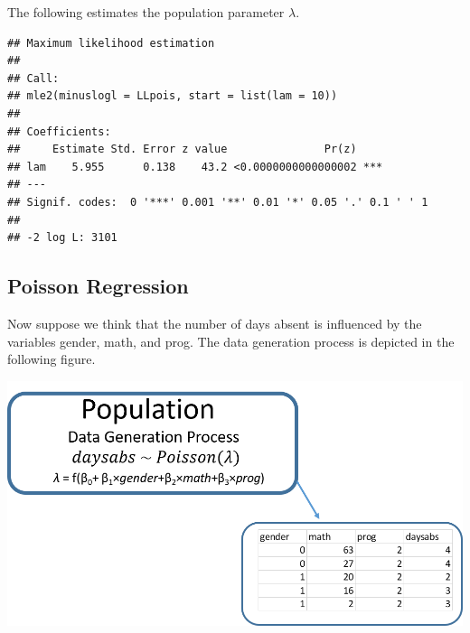 \documentclass[
]{article}
\newenvironment{Shaded}{\begin{snugshade}}{\end{snugshade}}
\newcommand{\AttributeTok}[1]{\textcolor[rgb]{0.77,0.63,0.00}{#1}}
\newcommand{\ControlFlowTok}[1]{\textcolor[rgb]{0.13,0.29,0.53}{\textbf{#1}}}
\newcommand{\DecValTok}[1]{\textcolor[rgb]{0.00,0.00,0.81}{#1}}
\newcommand{\FunctionTok}[1]{\textcolor[rgb]{0.00,0.00,0.00}{#1}}
\newcommand{\NormalTok}[1]{#1}
\newcommand{\OtherTok}[1]{\textcolor[rgb]{0.56,0.35,0.01}{#1}}
\newcommand{\SpecialCharTok}[1]{\textcolor[rgb]{0.00,0.00,0.00}{#1}}
\begin{document}
The following estimates the population parameter \(\lambda\).

\begin{Shaded}
\end{Shaded}

\begin{verbatim}
## Maximum likelihood estimation
## 
## Call:
## mle2(minuslogl = LLpois, start = list(lam = 10))
## 
## Coefficients:
##     Estimate Std. Error z value               Pr(z)    
## lam    5.955      0.138    43.2 <0.0000000000000002 ***
## ---
## Signif. codes:  0 '***' 0.001 '**' 0.01 '*' 0.05 '.' 0.1 ' ' 1
## 
## -2 log L: 3101
\end{verbatim}

\hypertarget{poisson-regression}{%
\subsection{Poisson Regression}\label{poisson-regression}}

Now suppose we think that the number of days absent is influenced by the
variables gender, math, and prog. The data generation process is
depicted in the following figure.

\includegraphics{estpic14.png}
\end{document}
